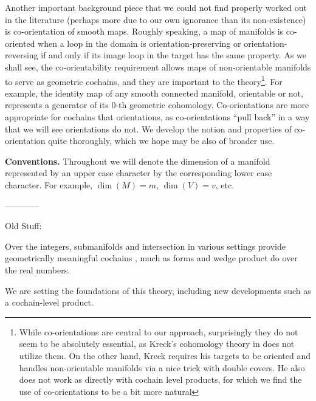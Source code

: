 Another important background piece that we could not find properly worked out in the literature (perhaps more due to our own ignorance than its non-existence) is co-orientation of smooth maps.
Roughly speaking, a map of manifolds is co-oriented when a loop in the domain is orientation-preserving or orientation-reversing if and only if its image loop in the target has the same property.
As we shall see, the co-orientability requirement allows maps of non-orientable manifolds to serve as geometric cochains, and they are important to the theory\footnote{While co-orientations are central to our approach, surprisingly they do not seem to be absolutely essential, as Kreck's cohomology theory in \cite{Krec10} does not utilize them.
On the other hand, Kreck requires his targets to be oriented and handles non-orientable manifolds via a nice trick with double covers.
He also does not work as directly with cochain level products, for which we find the use of co-orientations to be a bit more natural}.
For example, the identity map of any smooth connected manifold, orientable or not, represents a generator of its $0$-th geometric cohomology.
Co-orientations are more appropriate for cochains that orientations, as co-orientations ``pull back'' in a way that we will see orientations do not.
We develop the notion and properties of co-orientation quite thoroughly, which we hope may be also of broader use.

\textbf{Conventions.} Throughout we will denote the dimension of a manifold represented by an upper case character by the corresponding lower case character.
For example, $\dim(M)=m$, $\dim(V)=v$, etc.

------------

Old Stuff:


Over the integers, submanifolds and intersection in various settings provide geometrically meaningful cochains \cite{Lipy14, Joyc15},
much as forms and wedge product do over the real numbers.

We are setting the foundations of this theory, including new developments such as a cochain-level product.

